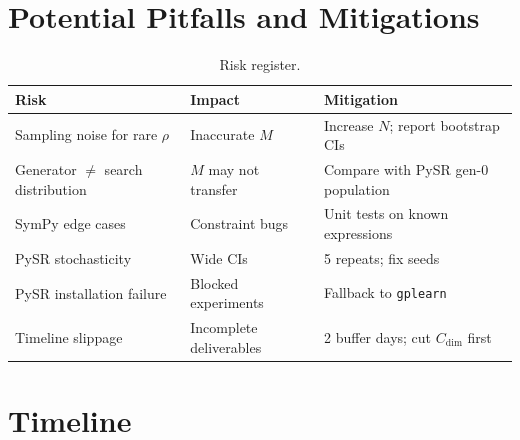 \documentclass[11pt,a4paper]{article}
\begin{document}
\section{Potential Pitfalls and Mitigations}
\label{sec:pitfalls}

\begin{table}[h]
\centering\small
\begin{tabularx}{\textwidth}{lXX}
\toprule
\textbf{Risk} & \textbf{Impact} & \textbf{Mitigation} \\
\midrule
Sampling noise for rare $\rho$ & Inaccurate $M$ & Increase $N$; report bootstrap CIs \\
Generator $\neq$ search distribution & $M$ may not transfer & Compare with PySR gen-0 population \\
SymPy edge cases & Constraint bugs & Unit tests on known expressions \\
PySR stochasticity & Wide CIs & 5 repeats; fix seeds \\
PySR installation failure & Blocked experiments & Fallback to \texttt{gplearn} \\
Timeline slippage & Incomplete deliverables & 2 buffer days; cut $C_{\mathrm{dim}}$ first \\
\bottomrule
\end{tabularx}
\caption{Risk register.}
\end{table}

\section{Timeline}
\label{sec:timeline}
\end{document}
